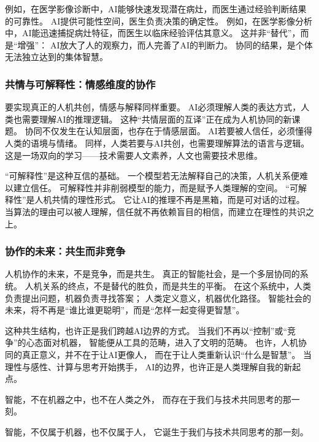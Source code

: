例如，在医学影像诊断中，AI能够快速发现潜在病灶，而医生通过经验判断结果的可靠性。  
AI提供可能性空间，医生负责决策的确定性。  
例如，在医学影像分析中，AI能迅速捕捉病灶特征，而医生以临床经验评估其意义。  
这并非“替代”，而是“增强”：  
AI放大了人的观察力，而人完善了AI的判断力。  
协同的结果，是个体无法独立达到的集体智慧。

\subsubsection{共情与可解释性：情感维度的协作}

要实现真正的人机共创，情感与解释同样重要。  
AI必须理解人类的表达方式，人类也需要理解AI的推理逻辑。  
这种“共情层面的互译”正在成为人机协同的新课题。  
协同不仅发生在认知层面，也存在于情感层面。  
AI若要被人信任，必须懂得人类的语境与情绪。  
同样，人类若要与AI共创，也需要理解算法的语言与逻辑。  
这是一场双向的学习——技术需要人文素养，人文也需要技术思维。

“可解释性”是这种互信的基础。  
一个模型若无法解释自己的决策，人机关系便难以建立信任。  
可解释性并非削弱模型的能力，而是赋予人类理解的空间。  
“可解释性”是人机共情的理性形式。  
它让AI的推理不再是黑箱，而是可对话的过程。  
当算法的理由可以被人理解，信任就不再依赖盲目的相信，而建立在理性的共识之上。

\subsubsection{协作的未来：共生而非竞争}

人机协作的未来，不是竞争，而是共生。  
真正的智能社会，是一个多层协同的系统。  
人机关系的终点，不是替代的胜负，而是共生的平衡。  
在这个系统中，人类负责提出问题，机器负责寻找答案；  
人类定义意义，机器优化路径。  
智能社会的未来，将不再是“谁比谁更聪明”，而是“怎样一起变得更智慧”。

这种共生结构，也许正是我们跨越AI边界的方式。  
当我们不再以“控制”或“竞争”的心态面对机器，  
智能便从工具的范畴，进入了文明的范畴。  
也许，人机协同的真正意义，并不在于让AI更像人，  
而在于让人类重新认识“什么是智慧”。  
当理性与感性、计算与思考开始携手，  
AI的边界，也许正是人类理解自我的新起点。

\begin{center}
智能，不在机器之中，也不在人类之外，  
而存在于我们与技术共同思考的那一刻。  
\end{center}
\begin{center}
智能，不仅属于机器，也不仅属于人，  
它诞生于我们与技术共同思考的那一刻。  
\end{center}


